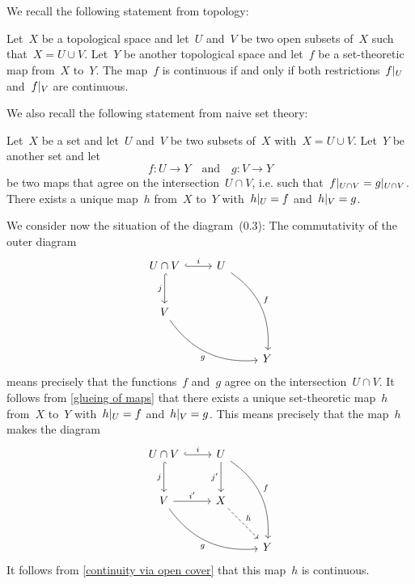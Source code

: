 \section{}

We recall the following statement from topology:

\begin{proposition}
	\label{continuity via open cover}
	Let~$X$ be a topological space and let~$U$ and~$V$ be two open subsets of~$X$ such that~$X = U \cup V$.
	Let~$Y$ be another topological space and let~$f$ be a set-theoretic map from~$X$ to~$Y$.
	The map~$f$ is continuous if and only if both restrictions~$f|_{U}$ and~$f|_{V}$ are continuous.
\end{proposition}

We also recall the following statement from naive set theory:

\begin{proposition}
	\label{glueing of maps}
	Let~$X$ be a set and let~$U$ and~$V$ be two subsets of~$X$ with~$X = U \cup V$.
	Let~$Y$ be another set and let
	\[
		f \colon U \to Y
		\quad\text{and}\quad
		g \colon V \to Y
	\]
	be two maps that agree on the intersection~$U \cap V$, i.e. such that~$f|_{U \cap V} = g|_{U \cap V}$.
	There exists a unique map~$h$ from~$X$ to~$Y$ with~$h|_{U} = f$ and~$h|_{V} = g$.
\end{proposition}

We consider now the situation of the diagram~(0.3):
The commutativity of the outer diagram
\[
	\begin{tikzcd}[row sep = large]
		U \cap V
		\arrow[hook]{r}[above]{i}
		\arrow[hook]{d}[left]{j}
		&
		U
		\arrow[bend left]{ddr}[above right]{f}
		&
		{}
		\\
		V
		\arrow[bend right]{drr}[below left]{g}
		&
		{}
		&
		{}
		\\
		{}
		&
		{}
		&
		Y
	\end{tikzcd}
\]
means precisely that the functions~$f$ and~$g$ agree on the intersection~$U \cap V$.
It follows from \cref{glueing of maps} that there exists a unique set-theoretic map~$h$ from~$X$ to~$Y$ with~$h|_{U} = f$ and~$h|_{V} = g$.
This means precisely that the map~$h$ makes the diagram
\[
	\begin{tikzcd}[row sep = large]
		U \cap V
		\arrow[hook]{r}[above]{i}
		\arrow[hook]{d}[left]{j}
		&
		U
		\arrow[bend left]{ddr}[above right]{f}
		\arrow{d}[left]{j'}
		&
		{}
		\\
		V
		\arrow[bend right]{drr}[below left]{g}
		\arrow{r}[above]{i'}
		&
		X
		\arrow[dashed]{dr}[above right]{h}
		&
		{}
		\\
		{}
		&
		{}
		&
		Y
	\end{tikzcd}
\]
It follows from \cref{continuity via open cover} that this map~$h$ is continuous.
